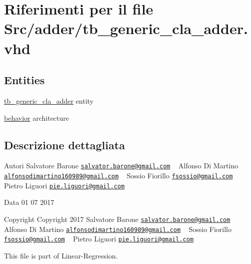 \hypertarget{tb__generic__cla__adder_8vhd}{\section{Riferimenti per il file Src/adder/tb\+\_\+generic\+\_\+cla\+\_\+adder.vhd}
\label{tb__generic__cla__adder_8vhd}
}
\subsection*{Entities}
\begin{DoxyCompactItemize}
\item 
\hyperlink{classtb__generic__cla__adder}{tb\+\_\+generic\+\_\+cla\+\_\+adder} entity
\item 
\hyperlink{classtb__generic__cla__adder_1_1behavior}{behavior} architecture
\end{DoxyCompactItemize}


\subsection{Descrizione dettagliata}
\begin{DoxyAuthor}{Autori}
Salvatore Barone \href{mailto:salvator.barone@gmail.com}{\tt salvator.\+barone@gmail.\+com} ~\newline
 Alfonso Di Martino \href{mailto:alfonsodimartino160989@gmail.com}{\tt alfonsodimartino160989@gmail.\+com} ~\newline
 Sossio Fiorillo \href{mailto:fsossio@gmail.com}{\tt fsossio@gmail.\+com} ~\newline
 Pietro Liguori \href{mailto:pie.liguori@gmail.com}{\tt pie.\+liguori@gmail.\+com} ~\newline

\end{DoxyAuthor}
\begin{DoxyDate}{Data}
01 07 2017
\end{DoxyDate}
\begin{DoxyCopyright}{Copyright}
Copyright 2017 Salvatore Barone \href{mailto:salvator.barone@gmail.com}{\tt salvator.\+barone@gmail.\+com} ~\newline
 Alfonso Di Martino \href{mailto:alfonsodimartino160989@gmail.com}{\tt alfonsodimartino160989@gmail.\+com} ~\newline
 Sossio Fiorillo \href{mailto:fsossio@gmail.com}{\tt fsossio@gmail.\+com} ~\newline
 Pietro Liguori \href{mailto:pie.liguori@gmail.com}{\tt pie.\+liguori@gmail.\+com} ~\newline

\end{DoxyCopyright}
This file is part of Linear-\/\+Regression.

